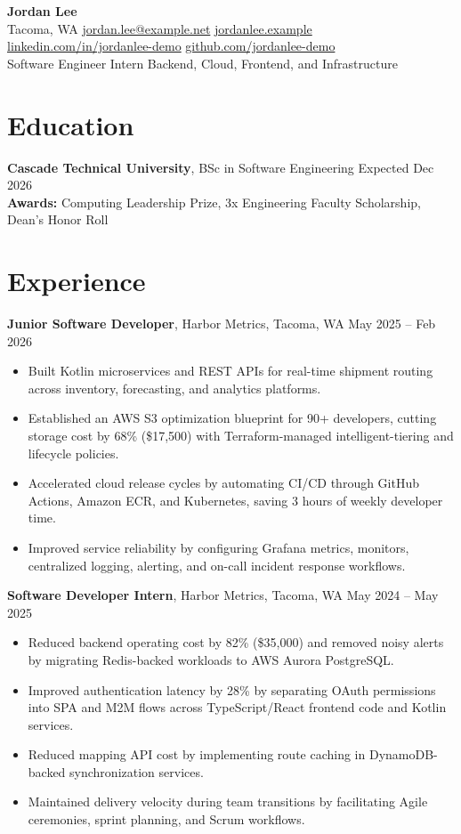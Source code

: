 \documentclass[10pt, letterpaper]{article}
\begin{document}
\begin{center}
    {\Large \textbf{Jordan Lee}}\\
    Tacoma, WA \textbar{}
    \href{mailto:jordan.lee@example.net}{jordan.lee@example.net} \textbar{}
    \href{https://jordanlee.example}{jordanlee.example} \textbar{}
    \href{https://linkedin.com/in/jordanlee-demo}{linkedin.com/in/jordanlee-demo} \textbar{}
    \href{https://github.com/jordanlee-demo}{github.com/jordanlee-demo}\\
    Software Engineer Intern \textbar{} Backend, Cloud, Frontend, and Infrastructure
\end{center}

\section{Education}
\textbf{Cascade Technical University}, BSc in Software Engineering \hfill Expected Dec 2026\\
\textbf{Awards:} Computing Leadership Prize, 3x Engineering Faculty Scholarship, Dean's Honor Roll

\section{Experience}
\textbf{Junior Software Developer}, Harbor Metrics, Tacoma, WA \hfill May 2025 -- Feb 2026
\begin{itemize}
    \item Built Kotlin microservices and REST APIs for real-time shipment routing across inventory, forecasting, and analytics platforms.
    \item Established an AWS S3 optimization blueprint for 90+ developers, cutting storage cost by 68\% (\$17,500) with Terraform-managed intelligent-tiering and lifecycle policies.
    \item Accelerated cloud release cycles by automating CI/CD through GitHub Actions, Amazon ECR, and Kubernetes, saving 3 hours of weekly developer time.
    \item Improved service reliability by configuring Grafana metrics, monitors, centralized logging, alerting, and on-call incident response workflows.
\end{itemize}

\textbf{Software Developer Intern}, Harbor Metrics, Tacoma, WA \hfill May 2024 -- May 2025
\begin{itemize}
    \item Reduced backend operating cost by 82\% (\$35,000) and removed noisy alerts by migrating Redis-backed workloads to AWS Aurora PostgreSQL.
    \item Improved authentication latency by 28\% by separating OAuth permissions into SPA and M2M flows across TypeScript/React frontend code and Kotlin services.
    \item Reduced mapping API cost by implementing route caching in DynamoDB-backed synchronization services.
    \item Maintained delivery velocity during team transitions by facilitating Agile ceremonies, sprint planning, and Scrum workflows.
\end{itemize}
\end{document}

